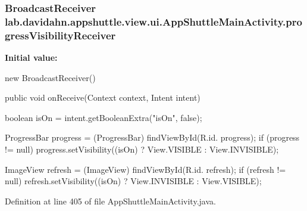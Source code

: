\hypertarget{classlab_1_1davidahn_1_1appshuttle_1_1view_1_1ui_1_1_app_shuttle_main_activity_a24eff696f658d9134cb3d4e40d489b83}{
\subsubsection[{progress\-Visibility\-Receiver}]{\setlength{\rightskip}{0pt plus 5cm}\-Broadcast\-Receiver {\bf lab.\-davidahn.\-appshuttle.\-view.\-ui.\-App\-Shuttle\-Main\-Activity.\-progress\-Visibility\-Receiver}}}\label{classlab_1_1davidahn_1_1appshuttle_1_1view_1_1ui_1_1_app_shuttle_main_activity_a24eff696f658d9134cb3d4e40d489b83}
{\bfseries \-Initial value\-:}
\begin{DoxyCode}
 new BroadcastReceiver() {
                public void onReceive(Context context, Intent intent) {
                        boolean isOn = intent.getBooleanExtra("isOn", false);

                        ProgressBar progress = (ProgressBar) findViewById(R.id.
      progress);
                        if (progress != null)
                                progress.setVisibility((isOn) ? View.VISIBLE : 
      View.INVISIBLE);

                        ImageView refresh = (ImageView) findViewById(R.id.
      refresh);
                        if (refresh != null)
                                refresh.setVisibility((isOn) ? View.INVISIBLE :
       View.VISIBLE);
                }
        }
\end{DoxyCode}


\-Definition at line 405 of file \-App\-Shuttle\-Main\-Activity.\-java.


